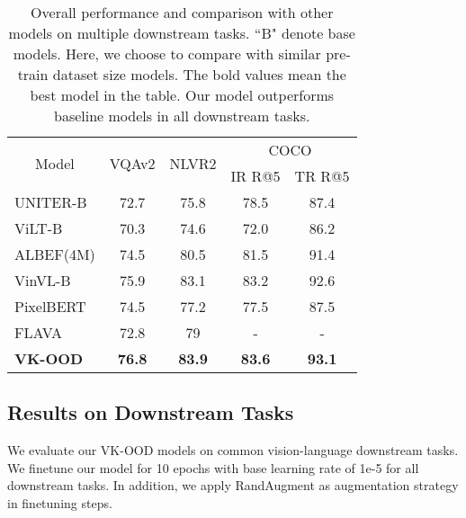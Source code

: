\documentclass{article}
\begin{document}
\begin{table}[]
\caption{Overall performance and comparison with other models on multiple downstream tasks. ``B" denote base models. Here, we choose to compare with similar pre-train dataset size models. The bold values mean the best model in the table. Our model outperforms baseline models in all downstream tasks.} \label{tab:down2}
\begin{center}
\begin{tabular}{l|c|c|cc}
\hline
\multicolumn{1}{c|}{\multirow{3}{*}{Model}} & \multirow{3}{*}{VQAv2} & \multirow{3}{*}{NLVR2} & \multicolumn{2}{c}{COCO}                          \\ \cline{4-5} 
\multicolumn{1}{c|}{}                       &                        &                        & \multirow{2}{*}{IR R@5} & \multirow{2}{*}{TR R@5} \\
\multicolumn{1}{c|}{}                       &                        &                        &                         &                         \\ \hline
UNITER-B                                    & 72.7                   & 75.8                   & 78.5                    & 87.4                    \\
ViLT-B                                      & 70.3                   & 74.6                   & 72.0                    & 86.2                    \\
ALBEF(4M)                                   & 74.5                   & 80.5                   & 81.5                    & 91.4                    \\
VinVL-B                                     & 75.9                   & 83.1                   & 83.2                    & 92.6                    \\
PixelBERT                                   & 74.5                   & 77.2                   & 77.5                    & 87.5                    \\
FLAVA                                       & 72.8                   & 79                     & -                       & -                       \\ \hline
\textbf{VK-OOD}                             & \textbf{76.8}          & \textbf{83.9}          & \textbf{83.6}           & \textbf{93.1}           \\ \hline
\end{tabular}
\end{center}
\end{table}
\subsection{Results on Downstream Tasks} \label{sec:down}
We evaluate our VK-OOD models on common vision-language downstream tasks.  We finetune our model for 10 epochs with base learning rate of 1e-5 for all downstream tasks. In addition, we apply RandAugment \cite{cubuk2020randaugment} as augmentation strategy in finetuning steps. 
\end{document}
